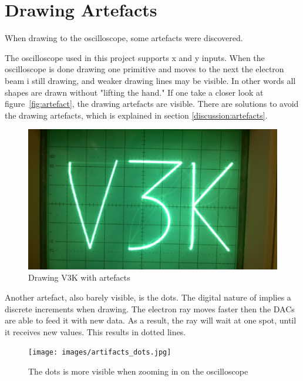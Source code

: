 \section{Drawing Artefacts}
\label{results:artefacts}
When drawing to the oscilloscope, some artefacts were discovered.

The oscilloscope used in this project supports x and y inputs.
When the oscilloscope is done drawing one primitive and moves to the next the electron beam i still drawing,
and weaker drawing lines may be visible.
In other words all shapes are drawn without "lifting the hand."
If one take a closer look at figure~\ref{fig:artefact}, the drawing artefacts are visible.
There are solutions to avoid the drawing artefacts, which is explained in section \ref{discussion:artefacts}.

\begin{figure}[h]
	    \includegraphics[width=\linewidth]{images/artefacts.jpg}
	    \caption{Drawing V3K with artefacts}
	    \label{fig:artifact}
\end{figure}

Another artefact, also barely visible, is the dots.
The digital nature of \vthreek implies a discrete increments when drawing.
The electron ray moves faster then the DACs are able to feed it with new data.
As a result, the ray will wait at one spot, until it receives new values.
This results in dotted lines.

\begin{figure}[h]
	    \texttt{[image: images/artifacts\_dots.jpg]}
	    \caption{The dots is more visible when zooming in on the oscilloscope}
	    \label{fig:artifact}
\end{figure}